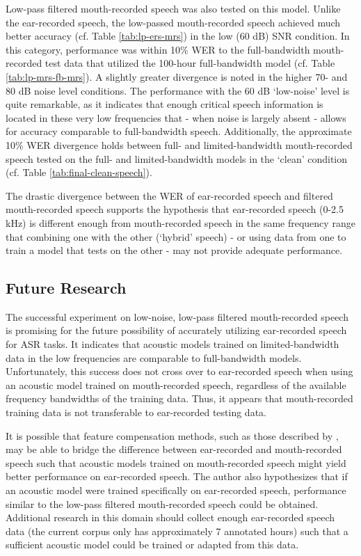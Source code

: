 Low-pass filtered mouth-recorded speech was also tested on this model.  Unlike the ear-recorded speech, the low-passed mouth-recorded speech achieved much better accuracy (cf. Table \ref{tab:lp-ers-mrs}) in the low (60 dB) SNR condition.  In this category, performance was within 10\% WER to the full-bandwidth mouth-recorded test data that utilized the 100-hour full-bandwidth model (cf. Table \ref{tab:lp-mrs-fb-mrs}). A slightly greater divergence is noted in the higher 70- and 80 dB noise level conditions.  The performance with the 60 dB `low-noise' level is quite remarkable, as it indicates that enough critical speech information is located in these very low frequencies that - when noise is largely absent - allows for accuracy comparable to full-bandwidth speech.  Additionally, the approximate 10\% WER divergence holds between full- and limited-bandwidth mouth-recorded speech tested on the full- and limited-bandwidth models in the `clean' condition (cf. Table \ref{tab:final-clean-speech}).

The drastic divergence between the WER of ear-recorded speech and filtered mouth-recorded speech supports the hypothesis that ear-recorded speech (0-2.5 kHz) is different enough from mouth-recorded speech in the same frequency range that combining one with the other (`hybrid' speech) - or using data from one to train a model that tests on the other - may not provide adequate performance.


\subsection{Future Research}
\label{chap4:future-research}

The successful experiment on low-noise, low-pass filtered mouth-recorded speech is promising for the future possibility of accurately utilizing ear-recorded speech for ASR tasks.  It indicates that acoustic models trained on limited-bandwidth data in the low frequencies are comparable to full-bandwidth models.  Unfortunately, this success does not cross over to ear-recorded speech when using an acoustic model trained on mouth-recorded speech, regardless of the available frequency bandwidths of the training data. Thus, it appears that mouth-recorded training data is not transferable to ear-recorded testing data.  

It is possible that feature compensation methods, such as those described by \cite{morales:09}, may be able to bridge the difference between ear-recorded and mouth-recorded speech such that acoustic models trained on mouth-recorded speech might yield better performance on ear-recorded speech.
The author also hypothesizes that if an acoustic model were trained specifically on ear-recorded speech, performance similar to the low-pass filtered mouth-recorded speech could be obtained.  Additional research in this domain should collect enough ear-recorded speech data (the current corpus only has approximately 7 annotated hours) such that a sufficient acoustic model could be trained or adapted from this data.


